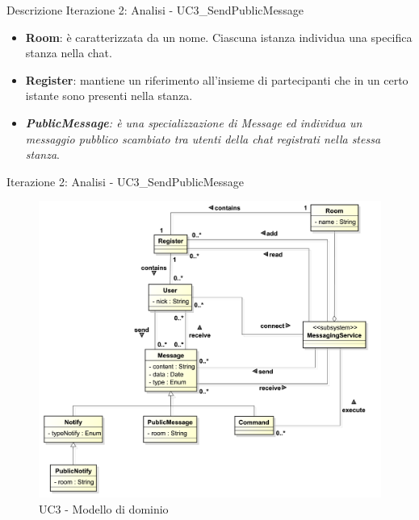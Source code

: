 \begin{frame} [allowframebreaks] {Descrizione Iterazione 2: Analisi - UC3\_SendPublicMessage}
\begin{itemize}
          MessagingService (es. /join '\#Medical' richiesta da parte dell'utente a registrarsi alla stanza Medical).        
    \item \textbf{Room}: è caratterizzata da un nome. Ciascuna istanza individua una specifica stanza nella chat.
    \item \textbf{Register}: mantiene un riferimento all’insieme di partecipanti che in un certo istante sono presenti nella stanza.
   \item \textit{\textbf{PublicMessage}: è una specializzazione di Message ed individua un messaggio pubblico scambiato tra utenti della chat registrati nella 
         stessa stanza}. 
  \end{itemize}
\end{frame}

\begin{frame} {Iterazione 2: Analisi - UC3\_SendPublicMessage}
   \begin{figure}
     \includegraphics[scale=0.17]{image_astah/Iteration_2_DomainModel/UC3_SendPublicMessage_DM.png}{\centering}
     \caption{UC3 - Modello di dominio}
     \label{fig_UC3_SPM_DM} 
   \end{figure}
\end{frame}

